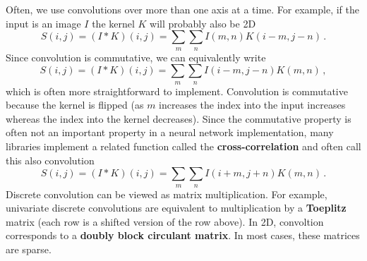 Often, we use convolutions over more than one axis at a time. For example, if
the input is an image $I$ the kernel $K$ will probably also be 2D
\begin{equation*}
  S(i,j) = (I \ast K)(i,j) = \sum_m \sum_n I(m,n)K(i-m, j-n)\,.
\end{equation*}
Since convolution is commutative, we can equivalently write
\begin{equation*}
  S(i,j) = (I \ast K)(i,j) = \sum_m \sum_n I(i-m,j-n)K(m, n)\,,
\end{equation*}
which is often more straightforward to implement. Convolution is commutative
because the kernel is flipped (\ie as $m$ increases the index into the input
increases whereas the index into the kernel decreases). Since the commutative
property is often not an important property in a neural network implementation,
many libraries implement a related function called the
\textbf{cross-correlation} and often call this also convolution
\begin{equation*}
  S(i,j) = (I \ast K)(i,j) = \sum_m \sum_n I(i+m,j+n)K(m, n)\,.
\end{equation*}
Discrete convolution can be viewed as matrix multiplication. For example,
univariate discrete convolutions are equivalent to multiplication by a
\textbf{Toeplitz} matrix (each row is a shifted version of the row above). In
2D, convoltion corresponds to a \textbf{doubly block circulant matrix}. In most
cases, these matrices are sparse.


